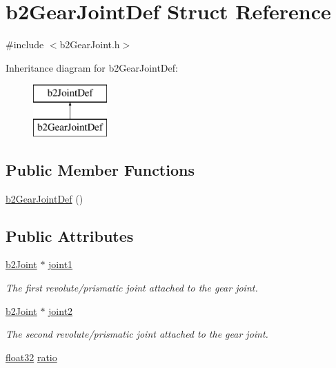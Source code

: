 \hypertarget{structb2_gear_joint_def}{}\section{b2\+Gear\+Joint\+Def Struct Reference}
\label{structb2_gear_joint_def}


{\ttfamily \#include $<$b2\+Gear\+Joint.\+h$>$}

Inheritance diagram for b2\+Gear\+Joint\+Def\+:\begin{figure}[H]
\begin{center}
\leavevmode
\includegraphics[height=2.000000cm]{structb2_gear_joint_def}
\end{center}
\end{figure}
\subsection*{Public Member Functions}
\begin{DoxyCompactItemize}
\item 
\mbox{\hyperlink{structb2_gear_joint_def_a2e9309a9065ff59704a09b198e57c876}{b2\+Gear\+Joint\+Def}} ()
\end{DoxyCompactItemize}
\subsection*{Public Attributes}
\begin{DoxyCompactItemize}
\item 
\mbox{\hyperlink{classb2_joint}{b2\+Joint}} $\ast$ \mbox{\hyperlink{structb2_gear_joint_def_ae42d33b54291a9e256f3810926883473}{joint1}}
\begin{DoxyCompactList}\small\item\em The first revolute/prismatic joint attached to the gear joint. \end{DoxyCompactList}\item 
\mbox{\hyperlink{classb2_joint}{b2\+Joint}} $\ast$ \mbox{\hyperlink{structb2_gear_joint_def_a73cf056fe40e63355073a01b097f4c82}{joint2}}
\begin{DoxyCompactList}\small\item\em The second revolute/prismatic joint attached to the gear joint. \end{DoxyCompactList}\item 
\mbox{\hyperlink{b2_settings_8h_aacdc525d6f7bddb3ae95d5c311bd06a1}{float32}} \mbox{\hyperlink{structb2_gear_joint_def_a57e9f4b6ce1ddc8b89b8455515f69323}{ratio}}
\end{DoxyCompactItemize}


